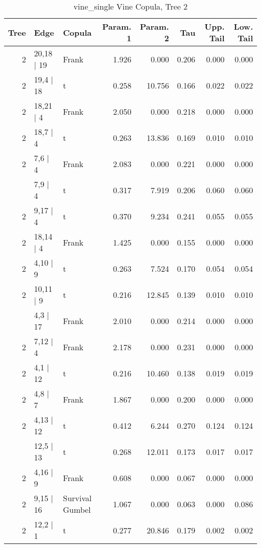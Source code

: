 \begin{table}

\caption{vine_single Vine Copula, Tree 2}
\centering
\begin{tabular}[t]{rllrrrrr}
\toprule
Tree & Edge & Copula & Param. 1 & Param. 2 & Tau & Upp. Tail & Low. Tail\\
\midrule
2 & 20,18 | 19 & Frank & 1.926 & 0.000 & 0.206 & 0.000 & 0.000\\
2 & 19,4 | 18 & t & 0.258 & 10.756 & 0.166 & 0.022 & 0.022\\
2 & 18,21 | 4 & Frank & 2.050 & 0.000 & 0.218 & 0.000 & 0.000\\
2 & 18,7 | 4 & t & 0.263 & 13.836 & 0.169 & 0.010 & 0.010\\
2 & 7,6 | 4 & Frank & 2.083 & 0.000 & 0.221 & 0.000 & 0.000\\
\addlinespace
2 & 7,9 | 4 & t & 0.317 & 7.919 & 0.206 & 0.060 & 0.060\\
2 & 9,17 | 4 & t & 0.370 & 9.234 & 0.241 & 0.055 & 0.055\\
2 & 18,14 | 4 & Frank & 1.425 & 0.000 & 0.155 & 0.000 & 0.000\\
2 & 4,10 | 9 & t & 0.263 & 7.524 & 0.170 & 0.054 & 0.054\\
2 & 10,11 | 9 & t & 0.216 & 12.845 & 0.139 & 0.010 & 0.010\\
\addlinespace
2 & 4,3 | 17 & Frank & 2.010 & 0.000 & 0.214 & 0.000 & 0.000\\
2 & 7,12 | 4 & Frank & 2.178 & 0.000 & 0.231 & 0.000 & 0.000\\
2 & 4,1 | 12 & t & 0.216 & 10.460 & 0.138 & 0.019 & 0.019\\
2 & 4,8 | 7 & Frank & 1.867 & 0.000 & 0.200 & 0.000 & 0.000\\
2 & 4,13 | 12 & t & 0.412 & 6.244 & 0.270 & 0.124 & 0.124\\
\addlinespace
2 & 12,5 | 13 & t & 0.268 & 12.011 & 0.173 & 0.017 & 0.017\\
2 & 4,16 | 9 & Frank & 0.608 & 0.000 & 0.067 & 0.000 & 0.000\\
2 & 9,15 | 16 & Survival Gumbel & 1.067 & 0.000 & 0.063 & 0.000 & 0.086\\
2 & 12,2 | 1 & t & 0.277 & 20.846 & 0.179 & 0.002 & 0.002\\
\bottomrule
\end{tabular}
\end{table}
